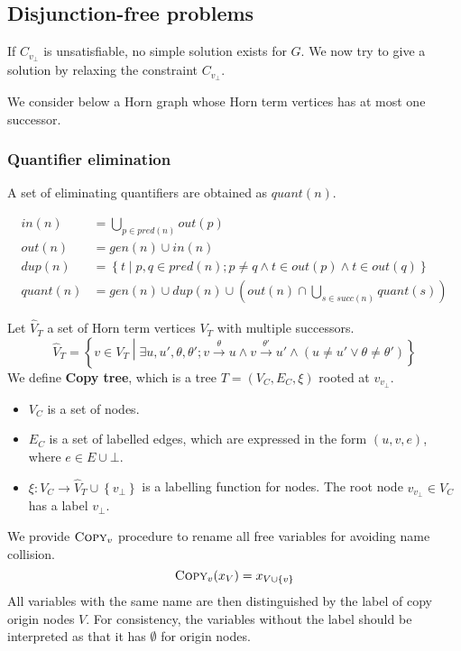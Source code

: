 \documentclass[a4paper,12pt]{article}
\newcommand{\edgel}[3]{#1\xrightarrow{#2}#3}
\begin{document}
\subsection{Disjunction-free problems}

If $C_{v_\bot}$ is unsatisfiable, no simple solution exists for
$G$. We now try to give a solution by relaxing the constraint
$C_{v_\bot}$.

We consider below a Horn graph whose Horn term vertices has at
most one successor.

\subsubsection{Quantifier elimination}

A set of eliminating quantifiers are obtained as $quant(n)$.

\begin{align*}
in(n) & = \bigcup_{p\in pred(n)} out(p) \\
out(n) & = gen(n) \cup in(n) \\
dup(n) & = \left\lbrace t \middle| p,q \in pred(n); p \ne q \wedge
 t \in out(p) \wedge t \in out(q) \right\rbrace \\
quant(n) & = gen(n) \cup dup(n) \cup
 (out(n) \cap \bigcup_{s \in succ(n)} quant(s))
\end{align*}

Let $\hat V_T$ a set of Horn term vertices $V_T$ with multiple
successors.
\[ \hat V_T = \left\lbrace v \in V_T \middle|
\exists u, u', \theta, \theta';
\edgel{v}{\theta}{u} \wedge \edgel{v}{\theta'}{u'} \wedge
(u \ne u' \vee \theta \ne \theta') \right\rbrace \]
We define \textbf{Copy tree}, which is a tree $T=(V_C,E_C,\xi)$
rooted at $v_{v_\bot}$.
\begin{itemize}
\item $V_C$ is a set of nodes.
\item $E_C$ is a set of labelled edges, which are expressed in the
  form $(u,v,e)$, where $e \in E \cup {\bot}$.
\item $\xi: V_C \rightarrow \hat V_T \cup \left\lbrace v_\bot
  \right\rbrace$ is a labelling function for nodes. The root node
  $v_{v_\bot} \in V_C$ has a label $v_\bot$.
\end{itemize}

We provide $\textsc{Copy}_v$ procedure to rename all free variables
for avoiding name collision.
\[ \textsc{Copy}_v (x_V) = x_{V \cup \left\lbrace v \right\rbrace} \]
All variables with the same name are then distinguished by the label
of copy origin nodes $V$. For consistency, the variables without the
label should be interpreted as that it has $\emptyset$ for origin
nodes.
\end{document}
